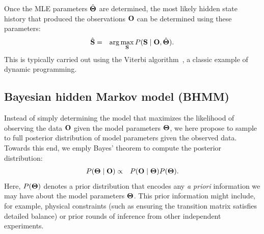 \documentclass[aps,pre,twocolumn,superscriptaddress,nofootinbib,longbibliography]{revtex4-1}
\newcommand{\bfm}[1]{{\bf #1}}
\begin{document}
{Once the MLE parameters $\hat{\bfm{\Theta}}$ are determined, the most likely hidden state history that produced the observations $\bfm{O}$ can be determined using these parameters:
\begin{eqnarray}
\hat{\bfm{S}} &=& \arg\max_\bfm{S} P(\bfm{S} \mid \bfm{O}, \hat{\bfm{\Theta}}) .
\end{eqnarray}
This is typically carried out using the Viterbi algorithm~\cite{viterbi:1967:IEEE-trans-info-theory:viterbi-algorithm}, a classic example of dynamic programming.


\subsection{Bayesian hidden Markov model (BHMM)}

Instead of simply determining the model that maximizes the likelihood of observing the data $\bfm{O}$ given the model parameters $\bfm{\Theta}$, {\color{magenta} we here propose to sample to full posterior distribution of model parameters given the observed data. 
Towards this end, we emply Bayes' theorem to compute the posterior distribution:}
\begin{eqnarray}
P(\bfm{\Theta} \mid \bfm{O}) &\propto& P(\bfm{O} \mid \bfm{\Theta}) P(\bfm{\Theta}) \label{equation:bayes-theorem}.
\end{eqnarray}
Here, $P(\bfm{\Theta})$ denotes a prior distribution that encodes any \emph{a priori} information we may have about the model parameters $\bfm{\Theta}$.
This prior information might include, for example, physical constraints (such as ensuring the transition matrix satisfies detailed balance) or prior rounds of inference from other independent experiments.

}
\end{document}
